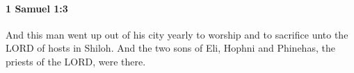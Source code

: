 
		\paragraph{1 Samuel 1:3} %
			\label{1SAMUEL-1-3}

			And this man went up out of his city yearly to worship and to sacrifice unto the LORD of hosts in Shiloh. And the two sons of Eli, Hophni and Phinehas, the priests of the LORD, were there.


